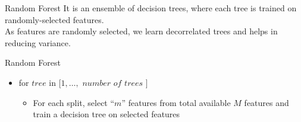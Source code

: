\documentclass{beamer}
\begin{document}
	\begin{frame}{Random Forest}
		It is an ensemble of decision trees, where each tree is trained on randomly-selected features.\\
		\vspace{1cm}
		As features are randomly selected, we learn decorrelated trees and helps in reducing variance.\\
	\end{frame}

	\begin{frame}{Random Forest}

	\begin{itemize}
		\item for $tree$ in $[1, \dots,$ $number$ $of$ $trees$ $]$
		\begin{itemize}
			\item For each split, select ``$m$'' features from total available $M$ features and train a decision tree on selected features
			
		\end{itemize}
	\end{itemize}

\end{frame}

%					
\end{document}
